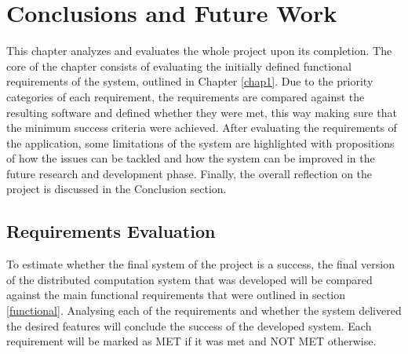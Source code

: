 \documentclass[10pt]{report}
\begin{document}
\chapter{Conclusions and Future Work}

This chapter analyzes and evaluates the whole project upon its completion. The core of the chapter consists of evaluating the initially defined functional requirements of the system, outlined in Chapter \ref{chap1}. Due to the priority categories of each requirement, the requirements are compared against the resulting software and defined whether they were met, this way making sure that the minimum success criteria were achieved. After evaluating the requirements of the application, some limitations of the system are highlighted with propositions of how the issues can be tackled and how the system can be improved in the future research and development phase. Finally, the overall reflection on the project is discussed in the Conclusion section.

\section{Requirements Evaluation} \label{evaluation}

To estimate whether the final system of the project is a success, the final version of the distributed computation system that was developed will be compared against the main functional requirements that were outlined in section \ref{functional}. Analysing each of the requirements and whether the system delivered the desired features will conclude the success of the developed system. Each requirement will be marked as MET if it was met and NOT MET otherwise.
\end{document}
